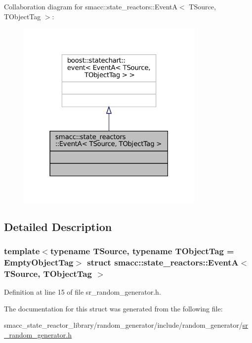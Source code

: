 Collaboration diagram for smacc\+:\+:state\+\_\+reactors\+:\+:EventA$<$ T\+Source, T\+Object\+Tag $>$\+:
\nopagebreak
\begin{figure}[H]
\begin{center}
\leavevmode
\includegraphics[width=259pt]{structsmacc_1_1state__reactors_1_1EventA__coll__graph}
\end{center}
\end{figure}


\subsection{Detailed Description}
\subsubsection*{template$<$typename T\+Source, typename T\+Object\+Tag = Empty\+Object\+Tag$>$\newline
struct smacc\+::state\+\_\+reactors\+::\+Event\+A$<$ T\+Source, T\+Object\+Tag $>$}



Definition at line 15 of file sr\+\_\+random\+\_\+generator.\+h.



The documentation for this struct was generated from the following file\+:\begin{DoxyCompactItemize}
\item 
smacc\+\_\+state\+\_\+reactor\+\_\+library/random\+\_\+generator/include/random\+\_\+generator/\hyperlink{sr__random__generator_8h}{sr\+\_\+random\+\_\+generator.\+h}\end{DoxyCompactItemize}
